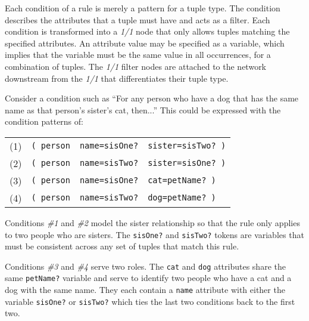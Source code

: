 Each condition of a rule is merely a pattern for a tuple type.
The condition describes the attributes that a tuple must have and acts
as a filter.  Each condition is transformed into a \emph{1/1} node
that only allows tuples matching the specified attributes.
An attribute value may be specified as a variable, which implies that
the variable must be the same value in all occurrences, for a 
combination of tuples.  The \emph{1/1} filter nodes are attached to
the network downstream from the \emph{1/1} that differentiates their
tuple type.

Consider a condition such as ``For any person who have a dog that
has the same name as that person's sister's cat, then...''  This could
be expressed with the condition patterns of:

\medskip

\begin{tabular}{llll}

(1) & \texttt{( person} & \texttt{name=sisOne?} & \texttt{sister=sisTwo? )}\\
(2) & \texttt{( person} & \texttt{name=sisTwo?} & \texttt{sister=sisOne? )}\\
(3) & \texttt{( person} & \texttt{name=sisOne?} & \texttt{cat=petName? )}\\
(4) & \texttt{( person} & \texttt{name=sisTwo?} & \texttt{dog=petName? )}\\

\end{tabular}

\medskip

Conditions \emph{\#1} and \emph{\#2} model the sister relationship so
that the rule only applies to two people who are sisters.  The
\verb|sisOne?| and \verb|sisTwo?| tokens are variables that must be
consistent across any set of tuples that match this rule.  

Conditions \emph{\#3} and \emph{\#4} serve two roles.  The \verb|cat|
and \verb|dog| attributes share the same \verb|petName?| variable and
serve to identify two people who have a cat and a dog with the same
name.  They each contain a \verb|name| attribute with either the
variable \verb|sisOne?| or \verb|sisTwo?| which ties the last two
conditions back to the first two.

\begin{figure}[htbpc]
  \begin{center}
  \end{center}
\end{figure}

